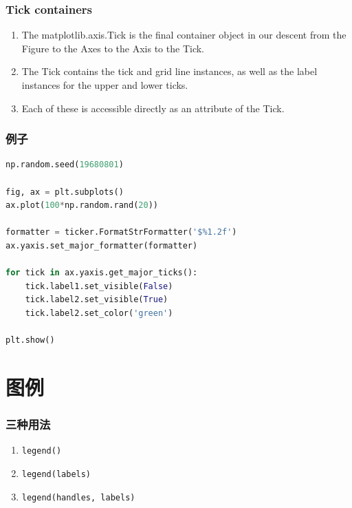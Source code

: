 \documentclass[UTF8,a4paper,12pt]{ctexart}  %
\providecommand{\tightlist}{\setlength{\itemsep}{0pt}\setlength{\parskip}{0pt}}
\newcommand{\passthrough}[1]{\lstset{mathescape=false}#1\lstset{mathescape=true}}
\begin{document}
\hypertarget{tick-containers}{%
\subsubsection{Tick containers}\label{tick-containers}}

\begin{enumerate}
\def\labelenumi{\arabic{enumi}.}
\tightlist
\item
  The matplotlib.axis.Tick is the final container object in our
  descent from the Figure to the Axes to the Axis to the Tick.
\item
  The Tick contains the tick and grid line instances, as well as the
  label instances for the upper and lower ticks.
\item
  Each of these is accessible directly as an attribute of the Tick.
\end{enumerate}

\hypertarget{ux4f8bux5b50-6}{%
\subsubsection{例子}\label{ux4f8bux5b50-6}}

\begin{lstlisting}[language=Python]
np.random.seed(19680801)

fig, ax = plt.subplots()
ax.plot(100*np.random.rand(20))

formatter = ticker.FormatStrFormatter('$%1.2f')
ax.yaxis.set_major_formatter(formatter)

for tick in ax.yaxis.get_major_ticks():
    tick.label1.set_visible(False)
    tick.label2.set_visible(True)
    tick.label2.set_color('green')

plt.show()
\end{lstlisting}

\hypertarget{ux56feux4f8b}{%
\section{图例}\label{ux56feux4f8b}}

\hypertarget{ux4e09ux79cdux7528ux6cd5}{%
\subsubsection{三种用法}\label{ux4e09ux79cdux7528ux6cd5}}

\begin{enumerate}
\def\labelenumi{\arabic{enumi}.}
\tightlist
\item
  \passthrough{\lstinline!legend()!}
\item
  \passthrough{\lstinline!legend(labels)!}
\item
  \passthrough{\lstinline!legend(handles, labels)!}
\end{enumerate}
\end{document}

